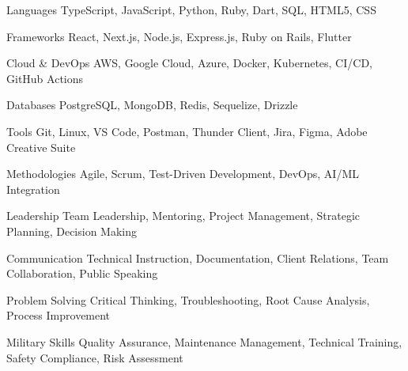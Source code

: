 
\begin{cvskills}

  \cvskill
    {Languages} %
    {TypeScript, JavaScript, Python, Ruby, Dart, SQL, HTML5, CSS} %

  \cvskill
    {Frameworks} %
    {React, Next.js, Node.js, Express.js, Ruby on Rails, Flutter} %

  \cvskill
    {Cloud \& DevOps} %
    {AWS, Google Cloud, Azure, Docker, Kubernetes, CI/CD, GitHub Actions} %

  \cvskill
    {Databases} %
    {PostgreSQL, MongoDB, Redis, Sequelize, Drizzle} %

  \cvskill
    {Tools} %
    {Git, Linux, VS Code, Postman, Thunder Client, Jira, Figma, Adobe Creative Suite} %

  \cvskill
    {Methodologies} %
    {Agile, Scrum, Test-Driven Development, DevOps, AI/ML Integration} %

\end{cvskills}


\begin{cvskills}

  \cvskill
    {Leadership} %
    {Team Leadership, Mentoring, Project Management, Strategic Planning, Decision Making} %

  \cvskill
    {Communication} %
    {Technical Instruction, Documentation, Client Relations, Team Collaboration, Public Speaking} %

  \cvskill
    {Problem Solving} %
    {Critical Thinking, Troubleshooting, Root Cause Analysis, Process Improvement} %

  \cvskill
    {Military Skills} %
    {Quality Assurance, Maintenance Management, Technical Training, Safety Compliance, Risk Assessment} %

\end{cvskills}
